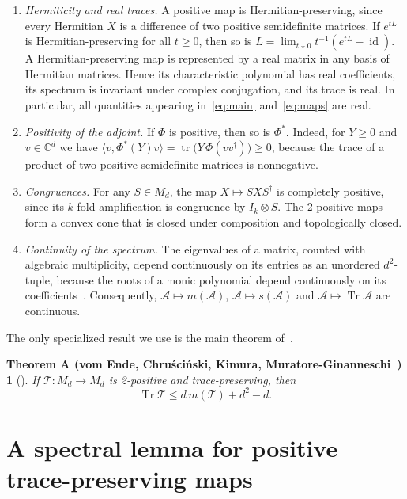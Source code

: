 \documentclass[11pt,a4paper]{article}
\theoremstyle{plain}
\newtheorem*{theoremA}{Theorem A {\normalfont(vom Ende, Chru\'sci\'nski, Kimura, Muratore-Ginanneschi~\cite{vEC+26})}}
\theoremstyle{definition}
\theoremstyle{remark}
\numberwithin{equation}{section}
\newcommand{\C}{\mathbb{C}}
\newcommand{\M}{M_d}
\newcommand{\tr}{\operatorname{tr}}
\newcommand{\Tr}{\operatorname{Tr}}
\newcommand{\id}{\operatorname{id}}
\newcommand{\mmin}{m}
\newcommand{\smax}{s}
\newcommand{\cA}{\mathcal{A}}
\newcommand{\cT}{\mathcal{T}}
\begin{document}
\begin{enumerate}
\renewcommand{\theenumi}{(P\arabic{enumi})}\renewcommand{\labelenumi}{\theenumi}
\item \label{P1}
  \emph{Hermiticity and real traces.} A positive map is Hermitian-preserving,
  since every Hermitian $X$ is a difference of two positive semidefinite matrices.
  If $e^{tL}$ is Hermitian-preserving for all $t\ge0$, then so is
  $L=\lim_{t\downarrow0}t^{-1}(e^{tL}-\id)$. A Hermitian-preserving map is
  represented by a real matrix in any basis of Hermitian matrices. Hence
  its characteristic polynomial has real coefficients, its spectrum is
  invariant under complex conjugation, and its trace is real. In
  particular, all quantities appearing in~\eqref{eq:main} and~\eqref{eq:maps}
  are real.
\item \label{P2}
  \emph{Positivity of the adjoint.} If $\Phi$ is positive, then so is $\Phi^*$.
  Indeed, for $Y\ge0$ and $v\in\C^d$ we have
  $\langle v,\Phi^*(Y)v\rangle=\tr\bigl(Y\,\Phi(vv^\dagger)\bigr)\ge0$, because the
  trace of a product of two positive semidefinite matrices is nonnegative.
\item \label{P3}
  \emph{Congruences.} For any $S\in\M$, the map $X\mapsto SXS^\dagger$ is completely
  positive, since its $k$-fold amplification is congruence by $I_k\otimes S$.
  The 2-positive maps form a convex cone that is closed under composition and
  topologically closed.
\item \label{P4}
  \emph{Continuity of the spectrum.} The eigenvalues of a matrix, counted with
  algebraic multiplicity, depend continuously on its entries as an unordered
  $d^2$-tuple, because the roots of a monic polynomial depend continuously on its
  coefficients~\cite[Ch.~II, Thm.~5.14]{Kat80}. Consequently, $\cA\mapsto\mmin(\cA)$,
  $\cA\mapsto\smax(\cA)$ and $\cA\mapsto\Tr\cA$ are continuous.
\end{enumerate}

The only specialized result we use is the main theorem of~\cite{vEC+26}.

\begin{theoremA}[{\cite[Thm.~1]{vEC+26}}]
If $\cT\colon\M\to\M$ is 2-positive and trace-preserving, then
\begin{equation}\label{eq:thmA}
  \Tr\cT\le d\,\mmin(\cT)+d^2-d .
\end{equation}
\end{theoremA}

\section{A spectral lemma for positive trace-preserving maps}\label{sec:spectral}
\end{document}
